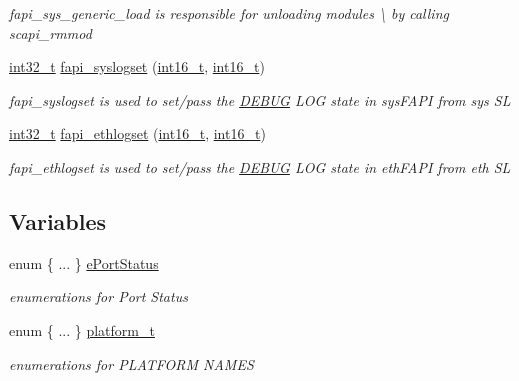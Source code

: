 \begin{DoxyCompactItemize}
\begin{DoxyCompactList}\small\item\em fapi\-\_\-sys\-\_\-generic\-\_\-load is responsible for unloading modules \textbackslash{} by calling scapi\-\_\-rmmod \end{DoxyCompactList}\item 
\hyperlink{commondefs_8h_a32f2e37ee053cf2ce8ca28d1f74630e5}{int32\-\_\-t} \hyperlink{group__FAPI__SYSTEM_ga617874f1c8ccfd792ea4f8a238ca4349}{fapi\-\_\-syslogset} (\hyperlink{commondefs_8h_a66634143db08bebe9b46ab4cb1fc6fd3}{int16\-\_\-t}, \hyperlink{commondefs_8h_a66634143db08bebe9b46ab4cb1fc6fd3}{int16\-\_\-t})
\begin{DoxyCompactList}\small\item\em fapi\-\_\-syslogset is used to set/pass the \hyperlink{structDEBUG}{D\-E\-B\-U\-G} L\-O\-G state in sys\-F\-A\-P\-I from sys S\-L \end{DoxyCompactList}\item 
\hyperlink{commondefs_8h_a32f2e37ee053cf2ce8ca28d1f74630e5}{int32\-\_\-t} \hyperlink{group__FAPI__SYSTEM_ga0f5c893fb05c814de9520c2dff8da25d}{fapi\-\_\-ethlogset} (\hyperlink{commondefs_8h_a66634143db08bebe9b46ab4cb1fc6fd3}{int16\-\_\-t}, \hyperlink{commondefs_8h_a66634143db08bebe9b46ab4cb1fc6fd3}{int16\-\_\-t})
\begin{DoxyCompactList}\small\item\em fapi\-\_\-ethlogset is used to set/pass the \hyperlink{structDEBUG}{D\-E\-B\-U\-G} L\-O\-G state in eth\-F\-A\-P\-I from eth S\-L \end{DoxyCompactList}\end{DoxyCompactItemize}
\subsection*{Variables}
\begin{DoxyCompactItemize}
\item 
\hypertarget{group__FAPI__SYSTEM_ga57db56561f2d0b48f60b3db8f51499a3}{enum  \{ ... \}  \hyperlink{group__FAPI__SYSTEM_ga57db56561f2d0b48f60b3db8f51499a3}{e\-Port\-Status}}\label{group__FAPI__SYSTEM_ga57db56561f2d0b48f60b3db8f51499a3}

\begin{DoxyCompactList}\small\item\em enumerations for Port Status \end{DoxyCompactList}\item 
\hypertarget{group__FAPI__SYSTEM_gace63e20207a3afa5f2b7f102f47937da}{enum  \{ ... \}  \hyperlink{group__FAPI__SYSTEM_gace63e20207a3afa5f2b7f102f47937da}{platform\-\_\-t}}\label{group__FAPI__SYSTEM_gace63e20207a3afa5f2b7f102f47937da}

\begin{DoxyCompactList}\small\item\em enumerations for P\-L\-A\-T\-F\-O\-R\-M N\-A\-M\-E\-S \end{DoxyCompactList}\end{DoxyCompactItemize}


